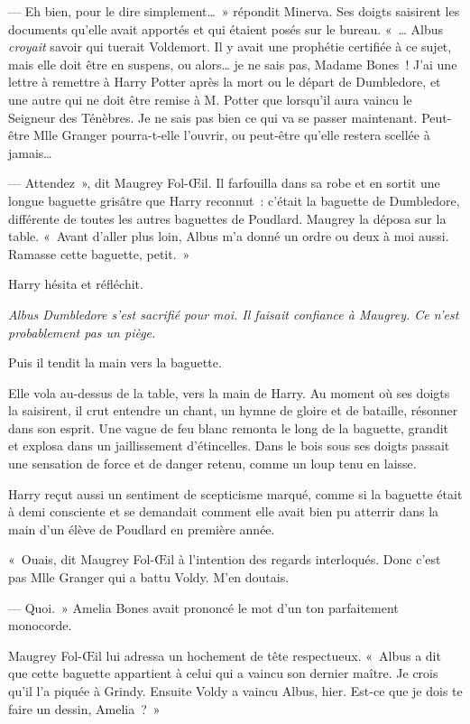 --- Eh bien, pour le dire simplement…~»
répondit Minerva.
Ses doigts saisirent les documents qu'elle avait apportés et qui étaient posés sur le bureau.
«~… Albus \emph{croyait} savoir qui tuerait Voldemort.
Il y avait une prophétie certifiée à ce sujet, mais elle doit être en suspens, ou alors… je ne sais pas, Madame Bones~!
J'ai une lettre à remettre à Harry Potter après la mort ou le départ de Dumbledore, et une autre qui ne doit être remise à M. Potter que lorsqu'il aura vaincu le Seigneur des Ténèbres.
Je ne sais pas bien ce qui va se passer maintenant.
Peut-être Mlle Granger pourra-t-elle l'ouvrir, ou peut-être qu'elle restera scellée à jamais…

--- Attendez~», dit Maugrey Fol-Œil.
Il farfouilla dans sa robe et en sortit une longue baguette grisâtre que Harry reconnut~: c'était la baguette de Dumbledore, différente de toutes les autres baguettes de Poudlard.
Maugrey la déposa sur la table.
«~Avant d'aller plus loin, Albus m'a donné un ordre ou deux à moi aussi.
Ramasse cette baguette, petit.~»

Harry hésita et réfléchit.

\emph{Albus Dumbledore s'est sacrifié pour moi.
Il faisait confiance à Maugrey.
Ce n'est probablement pas un piège.}

Puis il tendit la main vers la baguette.

Elle vola au-dessus de la table, vers la main de Harry.
Au moment où ses doigts la saisirent, il crut entendre un chant, un hymne de gloire et de bataille, résonner dans son esprit.
Une vague de feu blanc remonta le long de la baguette, grandit et explosa dans un jaillissement d'étincelles.
Dans le bois sous ses doigts passait une sensation de force et de danger retenu, comme un loup tenu en laisse.

Harry reçut aussi un sentiment de scepticisme marqué, comme si la baguette était à demi consciente et se demandait comment elle avait bien pu atterrir dans la main d'un élève de Poudlard en première année.

«~Ouais, dit Maugrey Fol-Œil à l'intention des regards interloqués.
Donc c'est pas Mlle Granger qui a battu Voldy.
M'en doutais.

--- Quoi.~»
Amelia Bones avait prononcé le mot d'un ton parfaitement monocorde.

Maugrey Fol-Œil lui adressa un hochement de tête respectueux.
«~Albus a dit que cette baguette appartient à celui qui a vaincu son dernier maître.
Je crois qu'il l'a piquée à Grindy.
Ensuite Voldy a vaincu Albus, hier.
Est-ce que je dois te faire un dessin, Amelia~?~»

